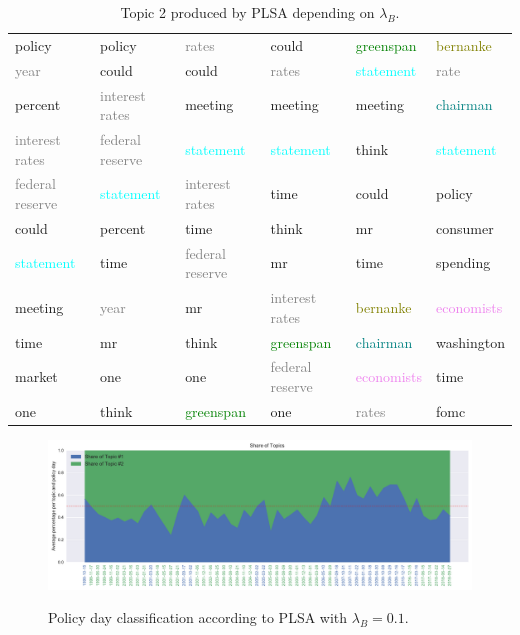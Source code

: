 \documentclass[11pt,a4paper,english,oneside]{book}
\numberwithin{equation}{chapter}
\begin{document}
\begin{table}
\begin{tabular}{ p{3cm}  p{3cm}  p{3cm}  p{3cm}  p{3cm}  p{3cm}}
		policy 							&  policy							& \textcolor{gray}{rates} 			& could 							& \textcolor{green}{greenspan}	& \textcolor{olive}{bernanke} \\
		\textcolor{gray}{year}			& could 							& could 							& \textcolor{gray}{rates} 			&\textcolor{cyan}{statement}	& \textcolor{gray}{rate}  \\
		percent 						& \textcolor{gray}{interest rates}	& meeting 							& meeting 							&meeting 						& \textcolor{teal}{chairman} \\
		\textcolor{gray}{interest rates}& \textcolor{gray}{federal reserve}	& \textcolor{cyan}{statement}	& \textcolor{cyan}{statement}			&think 							& \textcolor{cyan}{statement} \\
		\textcolor{gray}{federal reserve}& \textcolor{cyan}{statement}		& \textcolor{gray}{interest rates}	& time 								&could 							& policy \\
		could  							& percent 							& time 								& think 							&mr 							& consumer \\
		\textcolor{cyan}{statement}		& time 								& \textcolor{gray}{federal reserve}	& mr 								&time 							& spending \\
		meeting 						& \textcolor{gray}{year}			& mr   								& \textcolor{gray}{interest rates}	&\textcolor{olive}{bernanke}	& \textcolor{violet}{economists} \\
		time 							& mr 								& think   							& \textcolor{green}{greenspan}		&\textcolor{teal}{chairman} 	& washington \\
		market 							& one 								& one  								& \textcolor{gray}{federal reserve}	&\textcolor{violet}{economists}	& time \\
		one 							& think 							& \textcolor{green}{greenspan} 		& one 								&\textcolor{gray}{rates  }		& fomc \\		  
		\bottomrule %
	\end{tabular}
	\caption{Topic 2 produced by PLSA depending on $\lambda_B$.} %
	\label{tab:topics3} %
\end{table}

\begin{figure}
	\caption{Policy day classification according to PLSA with $\lambda_B = 0.1$.}
	\centering
	\includegraphics[scale=0.8]{Images/plsamodelling_bgLamb_0_1.pdf}
	\label{classPLSAL01}
\end{figure}
\end{document}
